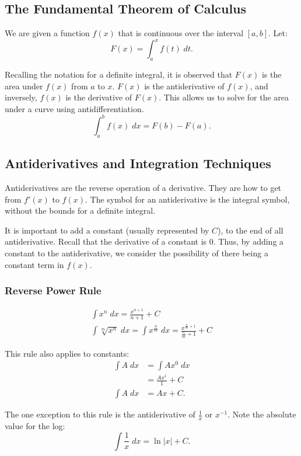 \subsection{The Fundamental Theorem of Calculus}
We are given a function $f(x)$ that is continuous over the interval $[a, b]$. Let:
\[ F(x) = \int_a^x f(t) \; dt. \]

Recalling the notation for a definite integral, it is observed that $F(x)$ is the area under $f(x)$ from $a$ to $x$. $F(x)$ is the antiderivative of $f(x)$, and inversely, $f(x)$ is the derivative of $F(x)$. This allows us to solve for the area under a curve using antidifferentiation.
\[ \int_a^b f(x) \; dx = F(b) - F(a). \]

\subsection{Antiderivatives and Integration Techniques}
Antiderivatives are the reverse operation of a derivative. They are how to get from $f'(x)$ to $f(x)$. The symbol for an antiderivative is the integral symbol, without the bounds for a definite integral.

It is important to add a constant (usually represented by $C$), to the end of all antiderivative. Recall that the derivative of a constant is $0$. Thus, by adding a constant to the antiderivative, we consider the possibility of there being a constant term in $f(x)$.

\subsubsection{Reverse Power Rule}
\begin{gather*}
	\int x^n \; dx = \frac{x^{n + 1}}{n + 1} + C \\[5pt]
	\int \sqrt[m]{x^n} \; dx = \int x^{\frac{n}{m}} \; dx = \frac{x^{\frac{n}{m} + 1}}{\frac{n}{m} + 1} + C
\end{gather*}

\noindent This rule also applies to constants:
\begin{align*}
	\int A \; dx &= \int A x^0 \; dx \\
	&= \frac{A x^1}{1} + C \\[5pt]
	\int A \; dx &= Ax + C.
\end{align*}

\noindent The one exception to this rule is the antiderivative of $\frac{1}{x}$ or $x^{-1}$. Note the absolute value for the log:
\[ \int \frac{1}{x} \; dx = \ln |x| + C. \]

